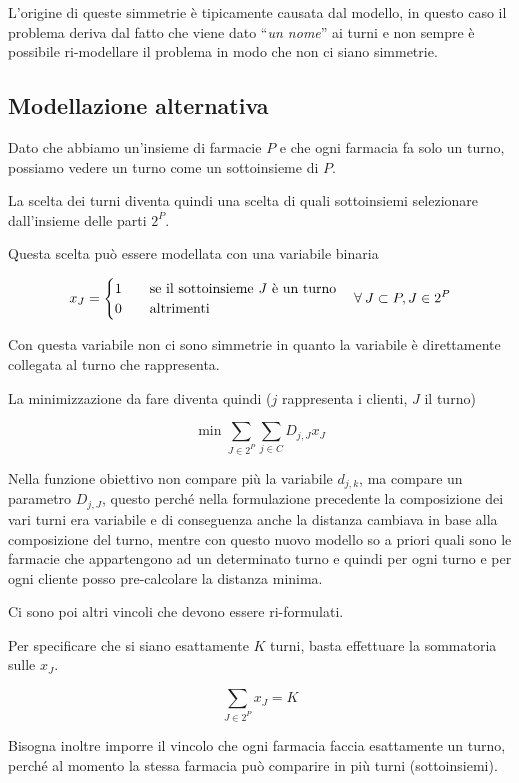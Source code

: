 L'origine di queste simmetrie è tipicamente causata dal modello, in questo caso il problema deriva dal fatto che viene dato ``\textit{un nome}'' ai turni e non sempre è possibile ri-modellare il problema in modo che non ci siano simmetrie.

\subsection{Modellazione alternativa}

Dato che abbiamo un'insieme di farmacie $P$ e che ogni farmacia fa solo un turno, possiamo vedere un turno come un sottoinsieme di $P$.

La scelta dei turni diventa quindi una scelta di quali sottoinsiemi selezionare dall'insieme delle parti $2^P$.

Questa scelta può essere modellata con una variabile binaria

$$
x_J = \begin{cases}
1 \quad& \text{se il sottoinsieme \textit{J} è un turno} \\
0 \quad&\text{altrimenti}
\end{cases} \quad \forall \: J \subset P, J \in 2^P
$$

\noindent Con questa variabile non ci sono simmetrie in quanto la variabile è direttamente collegata al turno che rappresenta.

La minimizzazione da fare diventa quindi ($j$ rappresenta i clienti, $J$ il turno)

$$
\min \sum\limits_{J \in 2^P} \sum\limits_{j \in C} D_{j,J}x_J
$$

\noindent Nella funzione obiettivo non compare più la variabile $d_{j,k}$, ma compare un parametro $D_{j,J}$, questo perché nella formulazione precedente la composizione dei vari turni era variabile e di conseguenza anche la distanza cambiava in base alla composizione del turno, mentre con questo nuovo modello so a priori quali sono le farmacie che appartengono ad un determinato turno e quindi per ogni turno e per ogni cliente posso pre-calcolare la distanza minima.

Ci sono poi altri vincoli che devono essere ri-formulati.

Per specificare che si siano esattamente $K$ turni, basta effettuare la sommatoria sulle $x_J$.

$$
\sum\limits_{J \in 2^P} x_J = K
$$

\noindent Bisogna inoltre imporre il vincolo che ogni farmacia faccia esattamente un turno, perché al momento la stessa farmacia può comparire in più turni (sottoinsiemi).

